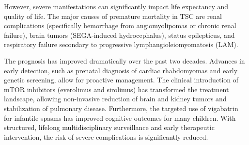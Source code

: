 However, severe manifestations can significantly impact life expectancy and quality of life. The major causes of premature mortality in TSC are renal complications (specifically hemorrhage from angiomyolipomas or chronic renal failure), brain tumors (SEGA-induced hydrocephalus), status epilepticus, and respiratory failure secondary to progressive lymphangioleiomyomatosis (LAM).

The prognosis has improved dramatically over the past two decades. Advances in early detection, such as prenatal diagnosis of cardiac rhabdomyomas and early genetic screening, allow for proactive management. The clinical introduction of mTOR inhibitors (everolimus and sirolimus) has transformed the treatment landscape, allowing non-invasive reduction of brain and kidney tumors and stabilization of pulmonary disease. Furthermore, the targeted use of vigabatrin for infantile spasms has improved cognitive outcomes for many children. With structured, lifelong multidisciplinary surveillance and early therapeutic intervention, the risk of severe complications is significantly reduced.

